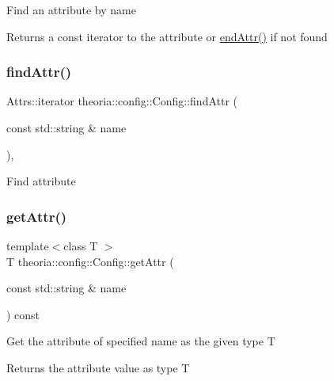 Find an attribute by name \begin{DoxyReturn}{Returns}
a const iterator to the attribute or \hyperlink{classtheoria_1_1config_1_1Config_adc788e451cd49c6b2c85948bf8f9fb21}{end\+Attr()} if not found 
\end{DoxyReturn}
\mbox{\label{classtheoria_1_1config_1_1Config_a5c3e05b3d7119443b0bcb61eb0404829}} 
\subsubsection{\texorpdfstring{find\+Attr()}{findAttr()}\hspace{0.1cm}{\footnotesize\ttfamily [2/2]}}
{\footnotesize\ttfamily Attrs\+::iterator theoria\+::config\+::\+Config\+::find\+Attr (\begin{DoxyParamCaption}\item[{const std\+::string \&}]{name }\end{DoxyParamCaption})\hspace{0.3cm}{\ttfamily [inline]}, {\ttfamily [protected]}}

Find attribute \mbox{\label{classtheoria_1_1config_1_1Config_a0170adaf1d64ada4eafb43758e520837}} 
\subsubsection{\texorpdfstring{get\+Attr()}{getAttr()}\hspace{0.1cm}{\footnotesize\ttfamily [1/2]}}
{\footnotesize\ttfamily template$<$class T $>$ \\
T theoria\+::config\+::\+Config\+::get\+Attr (\begin{DoxyParamCaption}\item[{const std\+::string \&}]{name }\end{DoxyParamCaption}) const\hspace{0.3cm}{\ttfamily [inline]}}

Get the attribute of specified name as the given type T \begin{DoxyReturn}{Returns}
the attribute value as type T 
\end{DoxyReturn}

